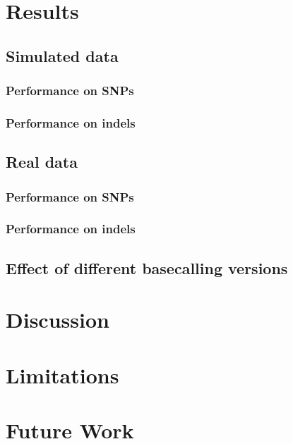\section{Results}
\label{section1.3}

\subsection{Simulated data}

\subsubsection{Performance on SNPs}

\subsubsection{Performance on indels}

\subsection{Real data}

\subsubsection{Performance on SNPs}

\subsubsection{Performance on indels}

\subsection{Effect of different basecalling versions}

\section{Discussion}

\section{Limitations}
\label{sec:denovo-limits}

\section{Future Work}
